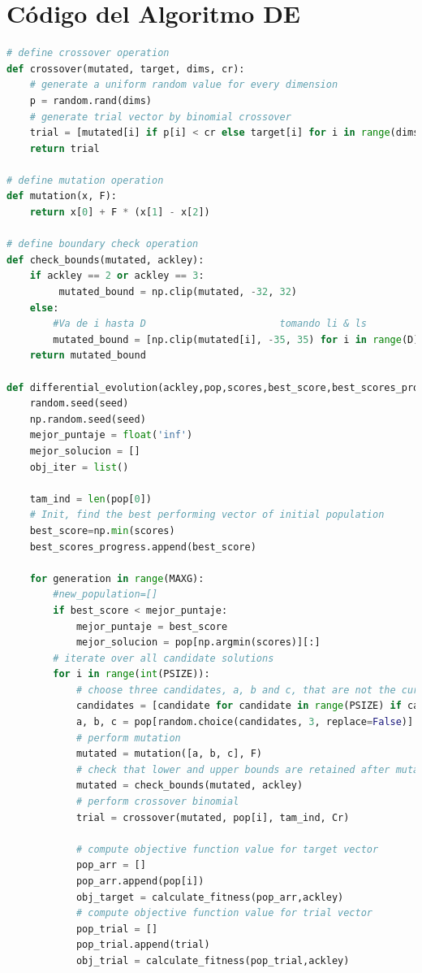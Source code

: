 \documentclass[10pt]{article}
\begin{document}
\section*{Código del Algoritmo DE}
\begin{lstlisting}[language=Python]
# define crossover operation
def crossover(mutated, target, dims, cr):
    # generate a uniform random value for every dimension
    p = random.rand(dims)
    # generate trial vector by binomial crossover
    trial = [mutated[i] if p[i] < cr else target[i] for i in range(dims)]
    return trial

# define mutation operation
def mutation(x, F):
    return x[0] + F * (x[1] - x[2])

# define boundary check operation
def check_bounds(mutated, ackley):
    if ackley == 2 or ackley == 3:
         mutated_bound = np.clip(mutated, -32, 32)
    else:
        #Va de i hasta D                       tomando li & ls
        mutated_bound = [np.clip(mutated[i], -35, 35) for i in range(D)]
    return mutated_bound

def differential_evolution(ackley,pop,scores,best_score,best_scores_progress,seed):
    random.seed(seed)
    np.random.seed(seed)
    mejor_puntaje = float('inf')
    mejor_solucion = []
    obj_iter = list()
    
    tam_ind = len(pop[0])
    # Init, find the best performing vector of initial population
    best_score=np.min(scores)
    best_scores_progress.append(best_score)
    
    for generation in range(MAXG):
        #new_population=[]
        if best_score < mejor_puntaje:
            mejor_puntaje = best_score
            mejor_solucion = pop[np.argmin(scores)][:]
        # iterate over all candidate solutions
        for i in range(int(PSIZE)):
            # choose three candidates, a, b and c, that are not the current one
            candidates = [candidate for candidate in range(PSIZE) if candidate != i]
            a, b, c = pop[random.choice(candidates, 3, replace=False)]
            # perform mutation
            mutated = mutation([a, b, c], F)
            # check that lower and upper bounds are retained after mutation
            mutated = check_bounds(mutated, ackley)
            # perform crossover binomial
            trial = crossover(mutated, pop[i], tam_ind, Cr)
           
            # compute objective function value for target vector
            pop_arr = []
            pop_arr.append(pop[i])
            obj_target = calculate_fitness(pop_arr,ackley) 
            # compute objective function value for trial vector
            pop_trial = []
            pop_trial.append(trial)
            obj_trial = calculate_fitness(pop_trial,ackley)
            

\end{lstlisting}
\end{document}
